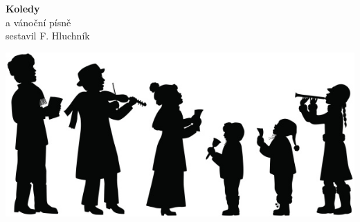 \vspace*{100pt}
\begin{center}
\fontsize{50}{60}\selectfont
\textbf{Koledy}\\
\vspace*{20pt}
\fontsize{30}{40}\selectfont
a vánoční písně\\
\vspace*{50pt}
\vspace*{\fill}
\fontsize{12}{20}\selectfont
sestavil F. Hluchník

\vspace*{\fill}
\hspace{-50pt}\includegraphics[scale=3]{musicians.jpg}
\end{center}
\newpage